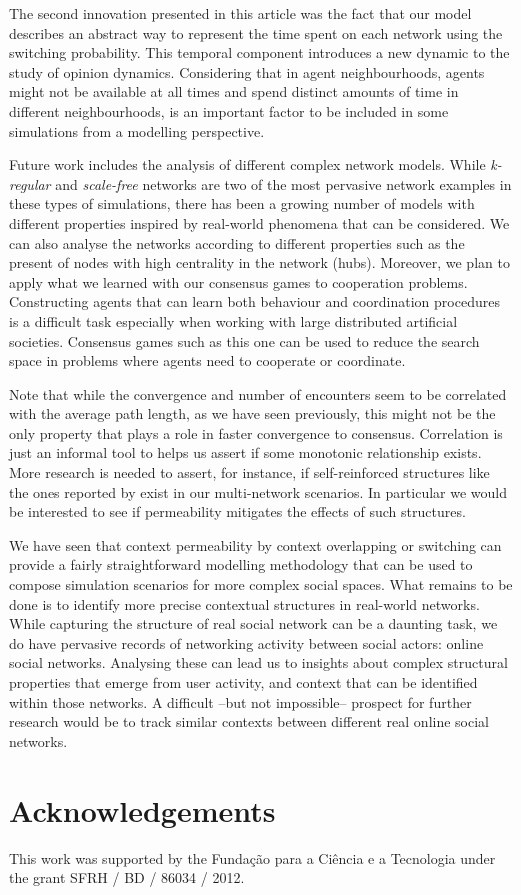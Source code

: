 \documentclass[preprint,number]{elsarticle}
\begin{document}
The second innovation presented in this article was the fact that our model describes an abstract way to represent the time spent on each network using the switching probability. This temporal component introduces a new dynamic to the study of opinion dynamics. Considering that in agent neighbourhoods, agents might not be available at all times and spend distinct amounts of time in different neighbourhoods, is an important factor to be included in some simulations from a modelling perspective. 

Future work includes the analysis of different complex network models. While \textit{k-regular} and \textit{scale-free} networks are two of the most pervasive network examples in these types of simulations, there has been a growing number of models with different properties inspired by real-world phenomena that can be considered. We can also analyse the networks according to different properties such as the present of nodes with high centrality in the network (hubs). Moreover, we  plan to apply what we learned with our consensus games to cooperation problems. Constructing agents that can learn both behaviour and coordination procedures is a difficult task especially when working with large distributed artificial societies. Consensus games such as this one can be used to reduce the search space in problems where agents need to cooperate or coordinate.

Note that while the convergence and number of encounters seem to be correlated with the average path length, as we have seen previously, this might not be the only property that plays a role in faster convergence to consensus. Correlation is just an informal tool to helps us assert if some monotonic relationship exists. More research is needed to assert, for instance, if self-reinforced structures like the ones reported by \cite{Villatoro2013} exist in our multi-network scenarios. In particular we would be interested to see if permeability mitigates the effects of such structures.

We have seen that context permeability by context overlapping or switching can provide a fairly straightforward modelling methodology that can be used to compose simulation scenarios for more complex social spaces. What remains to be done is to identify more precise contextual structures in real-world networks. While capturing the structure of real social network can be a daunting task, we do have pervasive records of networking activity between social actors: online social networks. Analysing these can lead us to insights about complex structural properties that emerge from user activity, and context that can be identified within those networks. A difficult --but not impossible-- prospect for further research would be to track similar contexts between different real online social networks.

\section*{Acknowledgements}
\noindent This work was supported by the Funda\c{c}\~ao para a Ci\^encia e a Tecnologia under the grant SFRH / BD / 86034 / 2012.

\newpage
\begin{appendices}
	
\end{appendices}




\end{document}
